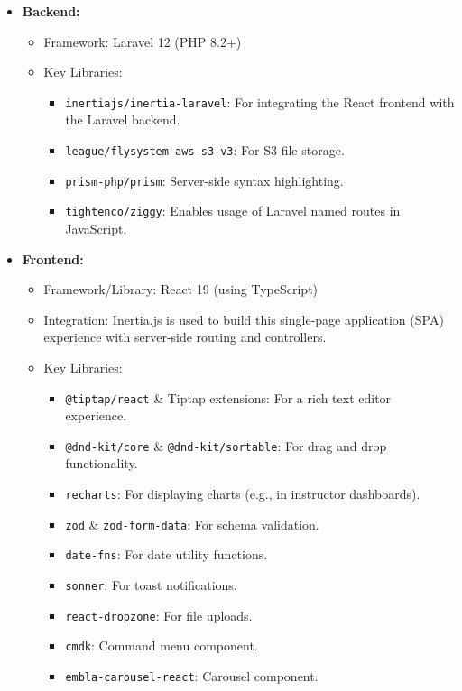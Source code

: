 \begin{itemize}
    \item \textbf{Backend:}
    \begin{itemize}
        \item Framework: Laravel 12 (PHP 8.2+)
        \item Key Libraries:
        \begin{itemize}
            \item \texttt{inertiajs/inertia-laravel}: For integrating the React frontend with the Laravel backend.
            \item \texttt{league/flysystem-aws-s3-v3}: For S3 file storage.
            \item \texttt{prism-php/prism}: Server-side syntax highlighting.
            \item \texttt{tightenco/ziggy}: Enables usage of Laravel named routes in JavaScript.
        \end{itemize}
    \end{itemize}
    \item \textbf{Frontend:}
    \begin{itemize}
        \item Framework/Library: React 19 (using TypeScript)
        \item Integration: Inertia.js is used to build this single-page application (SPA) experience with server-side routing and controllers.
        \item Key Libraries:
        \begin{itemize}
            \item \texttt{@tiptap/react} \& Tiptap extensions: For a rich text editor experience.
            \item \texttt{@dnd-kit/core} \& \texttt{@dnd-kit/sortable}: For drag and drop functionality.
            \item \texttt{recharts}: For displaying charts (e.g., in instructor dashboards).
            \item \texttt{zod} \& \texttt{zod-form-data}: For schema validation.
            \item \texttt{date-fns}: For date utility functions.
            \item \texttt{sonner}: For toast notifications.
            \item \texttt{react-dropzone}: For file uploads.
            \item \texttt{cmdk}: Command menu component.
            \item \texttt{embla-carousel-react}: Carousel component.

\end{itemize}
\end{itemize}
\end{itemize}
